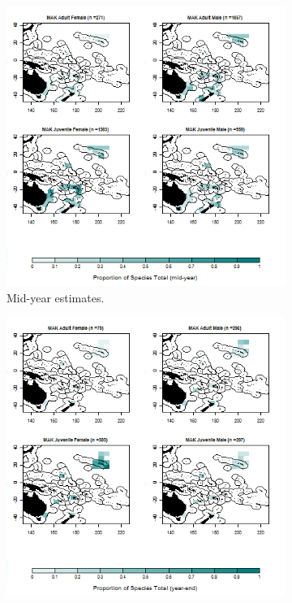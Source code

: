 \documentclass[12pt]{SCreport}
\begin{document}
\begin{landscape}
\begin{figure}
\centering
   \begin{subfigure}[b]{0.6\textwidth}
       \includegraphics[width=\textwidth]{../GRAPHICS/Defined/BI_26_Map_maturity_sex_MAK_MY}
       \caption{Mid-year estimates.}
       \label{fig:BI_26}
   \end{subfigure}
   \begin{subfigure}[b]{0.6\textwidth}
       \includegraphics[width=\textwidth]{../GRAPHICS/Defined/BI_25_Map_maturity_sex_MAK}

\end{subfigure}
\end{figure}
\end{landscape}
\end{document}
